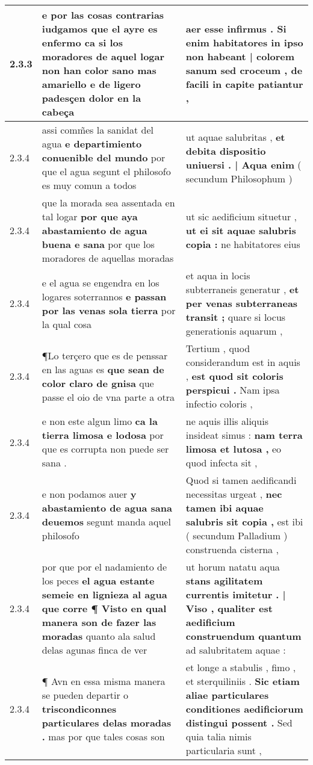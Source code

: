 \begin{tabular}{|p{1cm}|p{6.5cm}|p{6.5cm}|}
2.3.3 & e por las cosas contrarias iudgamos que el ayre es enfermo \textbf{ ca si los moradores de aquel logar non han color sano mas amariello } e de ligero padesçen dolor en la cabeça & aer esse infirmus . \textbf{ Si enim habitatores in ipso non habeant | colorem sanum sed croceum , } de facili in capite patiantur , \\\hline
2.3.4 & assi comm̃es la sanidat del agua \textbf{ e departimiento conuenible del mundo } por que el agua segunt el philosofo es muy comun a todos & ut aquae salubritas , \textbf{ et debita dispositio uniuersi . | Aqua enim } ( secundum Philosophum ) \\\hline
2.3.4 & que la morada sea assentada en tal logar \textbf{ por que aya abastamiento de agua buena e sana } por que los moradores de aquellas moradas & ut sic aedificium situetur , \textbf{ ut ei sit aquae salubris copia : } ne habitatores eius \\\hline
2.3.4 & e el agua se engendra en los logares soterrannos \textbf{ e passan por las venas sola tierra } por la qual cosa & et aqua in locis subterraneis generatur , \textbf{ et per venas subterraneas transit ; } quare si locus generationis aquarum , \\\hline
2.3.4 & ¶Lo terçero que es de penssar en las aguas es \textbf{ que sean de color claro de gnisa } que passe el oio de vna parte a otra & Tertium , quod considerandum est in aquis , \textbf{ est quod sit coloris perspicui . } Nam ipsa infectio coloris , \\\hline
2.3.4 & e non este algun limo \textbf{ ca la tierra limosa e lodosa } por que es corrupta non puede ser sana . & ne aquis illis aliquis insideat simus : \textbf{ nam terra limosa et lutosa , } eo quod infecta sit , \\\hline
2.3.4 & e non podamos auer \textbf{ y abastamiento de agua sana deuemos } segunt manda aquel philosofo & Quod si tamen aedificandi necessitas urgeat , \textbf{ nec tamen ibi aquae salubris sit copia , } est ibi ( secundum Palladium ) construenda cisterna , \\\hline
2.3.4 & por que por el nadamiento de los peces \textbf{ el agua estante semeie en lignieza al agua que corre ¶ Visto en qual manera son de fazer las moradas } quanto ala salud delas agunas finca de ver & ut horum natatu aqua \textbf{ stans agilitatem currentis imitetur . | Viso , qualiter est aedificium construendum quantum } ad salubritatem aquae : \\\hline
2.3.4 & ¶ Avn en essa misma manera se pueden departir o \textbf{ triscondiconnes particulares delas moradas . } mas por que tales cosas son & et longe a stabulis , fimo , et sterquiliniis . \textbf{ Sic etiam aliae particulares conditiones aedificiorum distingui possent . } Sed quia talia nimis particularia sunt , \\\hline

\end{tabular}
